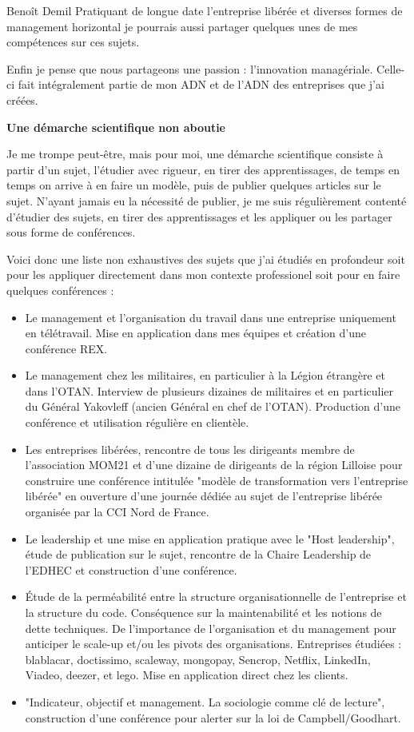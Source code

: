 \documentclass{lettre}
\begin{document}
\begin{letter}{ Benoît Demil }
    Pratiquant de longue date l'entreprise libérée et diverses formes de management horizontal je pourrais aussi partager quelques unes de mes compétences sur ces sujets. 

    Enfin je pense que nous partageons une passion : l'innovation managériale. Celle-ci fait intégralement partie de mon ADN et de l'ADN des entreprises que j'ai créées.

    \textbf{Une démarche scientifique non aboutie}

    Je me trompe peut-être, mais pour moi, une démarche scientifique consiste à partir d'un sujet, l'étudier avec rigueur, en tirer des apprentissages, de temps en temps on arrive à en faire un modèle, puis de publier quelques articles sur le sujet. N'ayant jamais eu la nécessité de publier, je me suis régulièrement contenté d'étudier des sujets, en tirer des apprentissages et les appliquer ou les partager sous forme de conférences.

    Voici donc une liste non exhaustives des sujets que j'ai étudiés en profondeur soit pour les appliquer directement dans mon contexte professionel soit pour en faire quelques conférences : 

    \begin{itemize}
        \item Le management et l'organisation du travail dans une entreprise uniquement en télétravail. Mise en application dans mes équipes et création d'une conférence REX.
        \item Le management chez les militaires, en particulier à la Légion étrangère et dans l'OTAN. Interview de plusieurs dizaines de militaires et en particulier du Général Yakovleff (ancien Général en chef de l'OTAN). Production d'une conférence et utilisation régulière en clientèle.
        \item Les entreprises libérées, rencontre de tous les dirigeants membre de l'association MOM21 et d'une dizaine de dirigeants de la région Lilloise pour construire une conférence intitulée "modèle de transformation vers l'entreprise libérée" en ouverture d'une journée dédiée au sujet de l'entreprise libérée organisée par la CCI Nord de France.
        \item Le leadership et une mise en application pratique avec le "Host leadership", étude de publication sur le sujet, rencontre de la Chaire Leadership de l'EDHEC et construction d'une conférence.
        \item Étude de la perméabilité entre la structure organisationnelle de l'entreprise et la structure du code. Conséquence sur la maintenabilité et les notions de dette techniques. De l'importance de l'organisation et du management pour anticiper le scale-up et/ou les pivots des organisations. Entreprises étudiées : blablacar, doctissimo, scaleway, mongopay, Sencrop, Netflix, LinkedIn, Viadeo, deezer, et lego. Mise en application direct chez les clients.
        \item "Indicateur, objectif et management. La sociologie comme clé de lecture", construction d'une conférence pour alerter sur la loi de Campbell/Goodhart.
    \end{itemize}


\end{letter}
\end{document}
